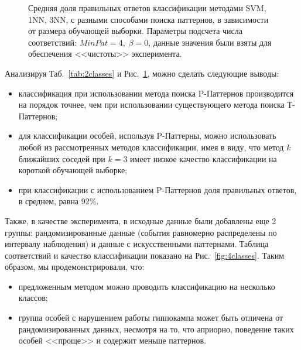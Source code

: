 \documentclass[12pt,fсeqn]{article}
\begin{document}
\begin{figure}[t]
\noindent{}
\caption{ Средняя доля правильных ответов классификации методами SVM, 1NN, 3NN, с разными способами поиска паттернов, в зависимости от размера
обучающей выборки. Параметры подсчета числа соответствий: $MinPat=4, \; \beta=0$, данные значения были взяты для обеспечения <<чистоты>> эксперимента. }
\label{fig:class2}
\end{figure}

Анализируя Таб.~\ref{tab:2classes} и Рис.~\ref{fig:class2}, можно сделать следующие выводы:
\begin{itemize}
 
\item классификация при использовании метода поиска P-Паттернов производится на порядок
точнее, чем при использовании существующего метода поиска Т-Паттернов;
\item для классификации особей, используя P-Паттерны, можно использовать 
любой из рассмотренных методов классификации,  имея в виду, что метод $k$ ближайших соседей при $k=3$ имеет низкое качество классификации
на короткой обучающей выборке;
\item при классификации с использованием P-Паттернов доля правильных ответов, в среднем, равна 92\%.
\end{itemize}

Также, в качестве эксперимента, в исходные данные были добавлены еще 2 группы: рандомизированные данные
(события равномерно распределены по интервалу наблюдения) и данные с искусственными паттернами. Таблица соответствий
и качество классификации показано на Рис.~\ref{fig:4classes}. Таким образом, мы продемонстрировали, что:
\begin{itemize}
 \item 
 предложенным методом можно проводить классификацию на несколько классов; 
\item
группа особей с нарушением работы гиппокампа может быть отличена от рандомизированных 
данных, несмотря на то, что априорно, поведение таких особей <<проще>> и содержит
меньше паттернов.
\end{itemize}
\end{document}
